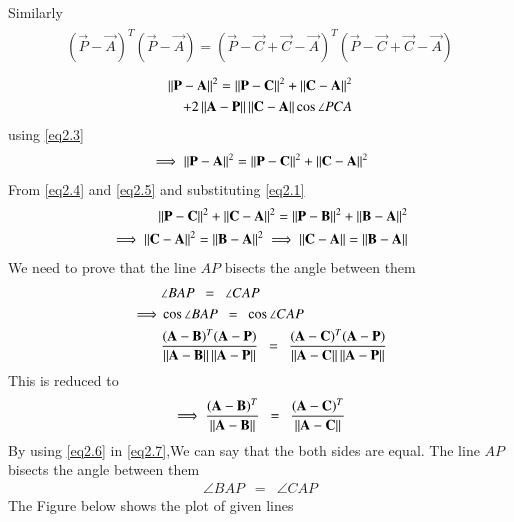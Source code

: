 \documentclass[journal,12pt,twocolumn]{IEEEtran}
\begin{document}
Similarly
\begin{align}
 \begin{split}
(\vec{P}-\vec{A})^T(\vec{P}-\vec{A})=(\vec{P}-\vec{C}+\vec{C}-\vec{A})^T(\vec{P}-\vec{C}+\vec{C}-\vec{A})
\end{split}
\end{align}
\begin{align}
 \begin{split}
\left\lVert\mathbf{P-A}\right\rVert^2=\left\lVert\mathbf{P-C}\right\rVert^2+\left\lVert\mathbf{C-A}\right\rVert^2\\ 
+2\left\lVert\mathbf{A}-\mathbf{P}\right\rVert\left\lVert\mathbf{C}-\mathbf{A}\right\rVert\cos\angle PCA \\
\end{split}
\end{align}
using \eqref{eq2.3}
\begin{align}
 \begin{split}
 \implies \left\lVert\mathbf{P-A}\right\rVert^2=\left\lVert\mathbf{P-C}\right\rVert^2+\left\lVert\mathbf{C-A}\right\rVert^2 \label{eq2.5}
 \end{split}
\end{align}
From \eqref{eq2.4} and \eqref{eq2.5} and substituting \eqref{eq2.1}
\begin{align}
\left\lVert\mathbf{P-C}\right\rVert^2+\left\lVert\mathbf{C-A}\right\rVert^2=\left\lVert\mathbf{P-B}\right\rVert^2+\left\lVert\mathbf{B-A}\right\rVert^2 \\
\implies \left\lVert\mathbf{C-A}\right\rVert^2=\left\lVert\mathbf{B-A}\right\rVert^2
\implies \left\lVert\mathbf{C-A}\right\rVert=\left\lVert\mathbf{B-A}\right\rVert \label{eq2.6}
\end{align}
We need to prove that the line  $AP$  bisects the angle between them
\begin{align}
 & \angle BAP \enspace = \enspace \angle CAP \label{1} \\
 \implies &\cos\angle BAP \enspace = \enspace \cos\angle CAP \\
 &  \frac{(\mathbf A -\mathbf B)^T(\mathbf{A}-\mathbf{P})}{\left\lVert\mathbf{A}-\mathbf{B}\right\rVert \left\lVert\mathbf{A}-\mathbf{P}\right\rVert } \enspace = \enspace \frac{(\mathbf A -\mathbf C)^T(\mathbf{A}-\mathbf{P})}{\left\lVert\mathbf{A}-\mathbf{C}\right\rVert \left\lVert\mathbf{A}-\mathbf{P}\right\rVert }
 \end{align}
 This is reduced to
 \begin{align}
 \implies 
 \frac{(\mathbf A -\mathbf B)^T}{\left\lVert\mathbf{A}-\mathbf{B}\right\rVert} \enspace = \enspace \frac{(\mathbf A -\mathbf C)^T}{\left\lVert\mathbf{A}-\mathbf{C}\right\rVert} \label{eq2.7}
\end{align}
  By using \eqref{eq2.6} in \eqref{eq2.7},We can say that the both sides are equal. The line $AP$ bisects the angle between them
  \begin{align}
  \angle BAP \enspace = \enspace \angle CAP
  \end{align}
The Figure below shows the plot of given lines
\end{document}
